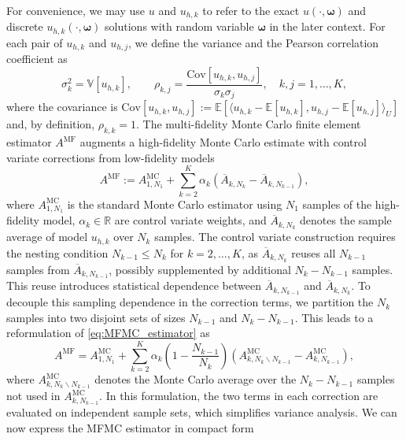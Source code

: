 For convenience, we may use $u$ and $u_{h,k}$ to refer to the exact $u(\cdot,\boldsymbol \omega)$ and discrete $u_{h,k}(\cdot,\boldsymbol \omega)$ solutions with random variable $\boldsymbol \omega$ in the later context. For each pair of $u_{h,k}$ and $u_{h,j}$, we define the variance and the Pearson correlation coefficient as
%
\begin{equation*}
    \sigma_k^2 = \mathbb{V}\left[u_{h,k}\right],\qquad \rho_{k,j} = \frac{\text{Cov}\left[ u_{h,k}, u_{h,j}\right]}{\sigma_k\sigma_j}, \quad k,j=1,\dots, K,
\end{equation*}
%
where the covariance is $\text{Cov}[u_{h,k}, u_{h,j}] := \mathbb{E}[\langle u_{h,k} - \mathbb{E}[u_{h,k}], u_{h,j} - \mathbb{E}[u_{h,j}]\rangle_U]$ and, by definition, $\rho_{k,k}=1$. The multi-fidelity Monte Carlo finite element estimator $A^{\text{MF}}$ augments a high-fidelity Monte Carlo estimate with control variate corrections from low-fidelity models
%
\begin{equation}\label{eq:MFMC_estimator}
    A^{\text{MF}} := A^{\text{MC}}_{1,N_1} + \sum_{k=2}^K \alpha_k\left(\overline{A}_{k,N_k} - \overline{A}_{k,N_{k-1}} \right),
\end{equation}
%
where $A^{\text{MC}}_{1,N_1}$ is the standard Monte Carlo estimator using $N_1$ samples of the high-fidelity model, $\alpha_k\in \mathbb{R}$ are control variate weights, and $\overline{A}_{k,N_k}$ denotes the sample average of model $u_{h,k}$ over $N_k$ samples. The control variate construction requires the nesting condition $N_{k-1}\le N_k$ for $k=2,\ldots, K$, as $\overline{A}_{k,N_{k}}$ reuses all $N_{k-1}$ samples from $\overline{A}_{k,N_{k-1}}$, possibly supplemented by additional $N_{k} - N_{k-1}$ samples. This reuse introduces statistical dependence between $\overline{A}_{k,N_{k-1}}$ and $\overline{A}_{k,N_{k}}$. To decouple this sampling dependence in the correction terms, we partition the $N_k$ samples into two disjoint sets of sizes  $N_{k-1}$ and $N_k - N_{k-1}$. This leads to a reformulation of \eqref{eq:MFMC_estimator} as
%
\begin{equation}\label{eq:MFMC_estimator_independent}
    A^{\text{MF}} = A^{\text{MC}}_{1,N_1} +  \sum_{k=2}^K \alpha_k\left(1-\frac{N_{k-1}}{N_{k}}\right)\left(A_{k,N_k\backslash N_{k-1}}^{\text{MC}}-A_{k,N_{k-1}}^{\text{MC}}\right),
\end{equation}
%
where $A^{\text{MC}}_{k,N_k \backslash N_{k-1}}$ denotes the Monte Carlo average over the $N_k - N_{k-1}$ samples not used in $A^{\text{MC}}_{k,N_{k-1}}$. In this formulation, the two terms in each correction are evaluated on independent sample sets, which simplifies variance analysis. We can now express the MFMC estimator in compact form
